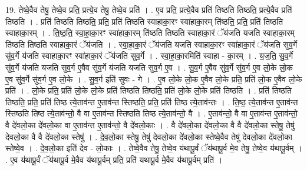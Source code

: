 \documentclass[17pt]{extarticle}
\begin{document}
19. तेष्वे॒वैव तेषु॒ तेष्वे॒व प्रति॒ प्रत्ये॒व तेषु॒ तेष्वे॒व प्रति॑ । . ए॒व प्रति॒ प्रत्ये॒वैव प्रति॑ तिष्ठति तिष्ठति॒ प्रत्ये॒वैव प्रति॑ तिष्ठति । . प्रति॑ तिष्ठति तिष्ठति॒ प्रति॒ प्रति॑ तिष्ठति स्वाहाका॒रꣳ स्वा॑हाका॒रम् ति॑ष्ठति॒ प्रति॒ प्रति॑ तिष्ठति स्वाहाका॒रम् । . ति॒ष्ठ॒ति॒ स्वा॒हा॒का॒रꣳ स्वा॑हाका॒रम् ति॑ष्ठति तिष्ठति स्वाहाका॒रं ॅय॑जति यजति स्वाहाका॒रम् ति॑ष्ठति तिष्ठति स्वाहाका॒रं ॅय॑जति । . स्वा॒हा॒का॒रं ॅय॑जति यजति स्वाहाका॒रꣳ स्वा॑हाका॒रं ॅय॑जति सुव॒र्गे सु॑व॒र्गे य॑जति स्वाहाका॒रꣳ स्वा॑हाका॒रं ॅय॑जति सुव॒र्गे । . स्वा॒हा॒का॒रमिति॑ स्वाहा - का॒रम् । . य॒ज॒ति॒ सु॒व॒र्गे सु॑व॒र्गे य॑जति यजति सुव॒र्ग ए॒वैव सु॑व॒र्गे य॑जति यजति सुव॒र्ग ए॒व । . सु॒व॒र्ग ए॒वैव सु॑व॒र्गे सु॑व॒र्ग ए॒व लो॒के लो॒क ए॒व सु॑व॒र्गे सु॑व॒र्ग ए॒व लो॒के । . सु॒व॒र्ग इति॑ सुवः - गे । . ए॒व लो॒के लो॒क ए॒वैव लो॒के प्रति॒ प्रति॑ लो॒क ए॒वैव लो॒के प्रति॑ । . लो॒के प्रति॒ प्रति॑ लो॒के लो॒के प्रति॑ तिष्ठति तिष्ठति॒ प्रति॑ लो॒के लो॒के प्रति॑ तिष्ठति । . प्रति॑ तिष्ठति तिष्ठति॒ प्रति॒ प्रति॑ तिष्ठ त्ये॒ताव॑न्त ए॒ताव॑न्त स्तिष्ठति॒ प्रति॒ प्रति॑ तिष्ठ त्ये॒ताव॑न्तः । . ति॒ष्ठ॒ त्ये॒ताव॑न्त ए॒ताव॑न्त स्तिष्ठति तिष्ठ त्ये॒ताव॑न्तो॒ वै वा ए॒ताव॑न्त स्तिष्ठति तिष्ठ त्ये॒ताव॑न्तो॒ वै । . ए॒ताव॑न्तो॒ वै वा ए॒ताव॑न्त ए॒ताव॑न्तो॒ वै दे॑वलो॒का दे॑वलो॒का वा ए॒ताव॑न्त ए॒ताव॑न्तो॒ वै दे॑वलो॒काः । . वै दे॑वलो॒का दे॑वलो॒का वै वै दे॑वलो॒का स्तेषु॒ तेषु॑ देवलो॒का वै वै दे॑वलो॒का स्तेषु॑ । . दे॒व॒लो॒का स्तेषु॒ तेषु॑ देवलो॒का दे॑वलो॒का स्तेष्वे॒वैव तेषु॑ देवलो॒का दे॑वलो॒का स्तेष्वे॒व । . दे॒व॒लो॒का इति॑ देव - लो॒काः । . तेष्वे॒वैव तेषु॒ तेष्वे॒व य॑थापू॒र्वं ॅय॑थापू॒र्व मे॒व तेषु॒ तेष्वे॒व य॑थापू॒र्वम् । . ए॒व य॑थापू॒र्वं ॅय॑थापू॒र्व मे॒वैव य॑थापू॒र्वम् प्रति॒ प्रति॑ यथापू॒र्व मे॒वैव य॑थापू॒र्वम् प्रति॑ । \newline
\end{document}
